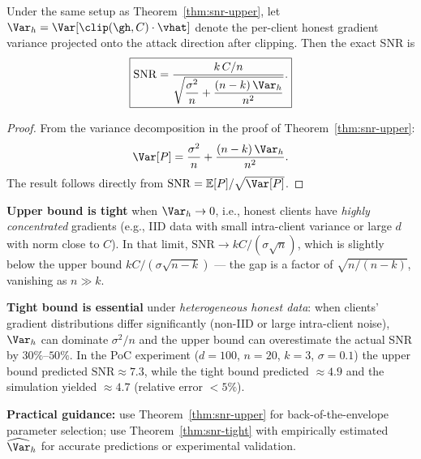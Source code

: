 \begin{theorem}
\label{thm:snr-tight}
Under the same setup as Theorem~\ref{thm:snr-upper}, let
$\Var_h = \Var[\clip(\gh,C)\cdot\vhat]$ denote the per-client honest
gradient variance projected onto the attack direction after clipping.
Then the exact SNR is
\[
  \boxed{\mathrm{SNR}
    = \frac{k\,C/n}
           {\displaystyle\sqrt{\dfrac{\sigma^2}{n}
             + \dfrac{(n-k)\,\Var_h}{n^2}}}.}
\]

\begin{proof}
From the variance decomposition in the proof of Theorem~\ref{thm:snr-upper}:
\[
  \Var[P]
    = \frac{\sigma^2}{n} + \frac{(n-k)\,\Var_h}{n^2}.
\]
The result follows directly from $\mathrm{SNR} = \mathbb{E}[P]/\sqrt{\Var[P]}$.
\end{proof}
\end{theorem}

\begin{remark}
\label{rem:bounds}
\textbf{Upper bound is tight} when $\Var_h \to 0$, i.e., honest clients
have \emph{highly concentrated} gradients (e.g., IID data with small
intra-client variance or large $d$ with norm close to $C$).
In that limit, $\mathrm{SNR} \to kC/(\sigma\sqrt{n})$, which is slightly
below the upper bound $kC/(\sigma\sqrt{n-k})$ — the gap is a factor of
$\sqrt{n/(n-k)}$, vanishing as $n\gg k$.

\textbf{Tight bound is essential} under \emph{heterogeneous honest data}:
when clients' gradient distributions differ significantly (non-IID or
large intra-client noise), $\Var_h$ can dominate $\sigma^2/n$ and the
upper bound can overestimate the actual SNR by $30\%$--$50\%$.
In the PoC experiment ($d=100$, $n=20$, $k=3$, $\sigma=0.1$) the
upper bound predicted $\mathrm{SNR}\approx 7.3$, while the tight bound
predicted $\approx 4.9$ and the simulation yielded $\approx 4.7$
(relative error $<5\%$).

\textbf{Practical guidance:} use Theorem~\ref{thm:snr-upper} for back-of-the-envelope
parameter selection; use Theorem~\ref{thm:snr-tight} with empirically
estimated $\widehat{\Var}_h$ for accurate predictions or experimental
validation.
\end{remark}
